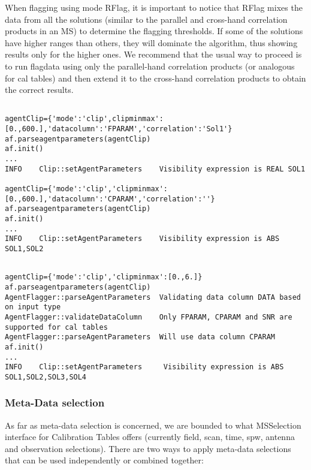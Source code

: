 \begin{enumerate}
When flagging using mode RFlag, it is important to notice that RFlag mixes the data from 
all the solutions (similar to the parallel and cross-hand correlation products in an MS) to 
determine the flagging thresholds. If some of the solutions have higher ranges than others, 
they will dominate the algorithm, thus showing results only for the higher ones. 
We recommend that the usual way to proceed is to run flagdata using only the parallel-hand 
correlation products (or analogous for cal tables) and then extend it to the cross-hand 
correlation products to obtain the correct results. 


\begin{verbatim}

agentClip={'mode':'clip',clipminmax':[0.,600.],'datacolumn':'FPARAM','correlation':'Sol1'}
af.parseagentparameters(agentClip)
af.init()
...
INFO	Clip::setAgentParameters	Visibility expression is REAL SOL1

agentClip={'mode':'clip','clipminmax':[0.,600.],'datacolumn':'CPARAM','correlation':''}
af.parseagentparameters(agentClip)
af.init()
...
INFO	Clip::setAgentParameters	Visibility expression is ABS SOL1,SOL2

\end{verbatim}

\begin{verbatim}

agentClip={'mode':'clip','clipminmax':[0.,6.]}
af.parseagentparameters(agentClip)
AgentFlagger::parseAgentParameters  Validating data column DATA based on input type
AgentFlagger::validateDataColumn    Only FPARAM, CPARAM and SNR are supported for cal tables
AgentFlagger::parseAgentParameters  Will use data column CPARAM
af.init()
...
INFO    Clip::setAgentParameters     Visibility expression is ABS SOL1,SOL2,SOL3,SOL4

\end{verbatim}

\end{enumerate}

\subsubsection{Meta-Data selection}

As far as meta-data selection is concerned, we are bounded to what MSSelection
interface for Calibration Tables offers (currently field, scan, time, spw, antenna
and observation selections). There are two ways to apply meta-data selections that can be used
independently or combined together:

